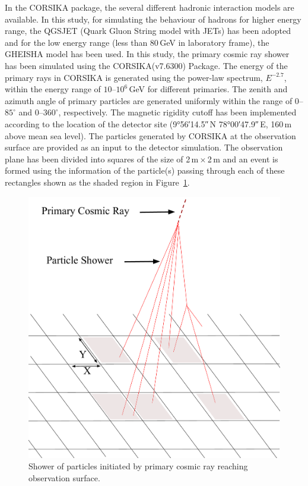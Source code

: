 \documentclass[a4paper,12pt,twoside]{article}
\begin{document}
In the CORSIKA package, the several different hadronic interaction models are available. In this study, for simulating the behaviour of hadrons for higher energy range, the QGSJET (Quark Gluon String model with JETs)\cite{corsika763} has been adopted and for the low energy range (less than 80\,GeV in laboratory frame), the GHEISHA model has been used. In this study, the primary cosmic ray shower has been simulated using the CORSIKA(v7.6300) Package. The energy of the primary rays in CORSIKA is generated using the power-law spectrum, $E^{-2.7}$, within the energy range of \mbox{$10$--$10^{6}$\,GeV} for different primaries. The zenith and azimuth angle of primary particles are generated uniformly within the range of \mbox{$0$--$85^\circ$} and \mbox{$0$--$360^\circ$}, respectively. The magnetic rigidity cutoff has been implemented according to the location of the detector site (\ang{9;56;14.5}\,N \ang{78;00;47.9}\,E, 160\,m above mean sea level). The particles generated by CORSIKA at the observation surface are provided as an input to the detector simulation. The observation plane has been divided into squares of the size of 2\,m\,$\times$\,2\,m and an event is formed using the information of the particle(s) passing through each of these rectangles shown as the shaded region in Figure~\ref{fig:eas}.
\begin{figure}
  \centering
  \includegraphics[width=0.99\linewidth]{EAS.pdf} 
  \caption{Shower of particles initiated by primary cosmic ray reaching observation surface.}
  \label{fig:eas}
\end{figure}
\end{document}
